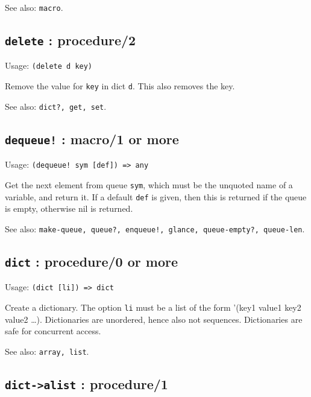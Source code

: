 \documentclass[
]{article}
\newcommand{\passthrough}[1]{#1}
\begin{document}
See also: \passthrough{\lstinline!macro!}.

\hypertarget{delete-procedure2-1}{%
\subsection{\texorpdfstring{\texttt{delete} :
procedure/2}{delete : procedure/2}}\label{delete-procedure2-1}}

Usage: \passthrough{\lstinline!(delete d key)!}

Remove the value for \passthrough{\lstinline!key!} in dict
\passthrough{\lstinline!d!}. This also removes the key.

See also: \passthrough{\lstinline!dict?, get, set!}.

\hypertarget{dequeue-macro1-or-more-1}{%
\subsection{\texorpdfstring{\texttt{dequeue!} : macro/1 or
more}{dequeue! : macro/1 or more}}\label{dequeue-macro1-or-more-1}}

Usage: \passthrough{\lstinline"(dequeue! sym [def]) => any"}

Get the next element from queue \passthrough{\lstinline!sym!}, which
must be the unquoted name of a variable, and return it. If a default
\passthrough{\lstinline!def!} is given, then this is returned if the
queue is empty, otherwise nil is returned.

See also:
\passthrough{\lstinline"make-queue, queue?, enqueue!, glance, queue-empty?, queue-len"}.

\hypertarget{dict-procedure0-or-more-1}{%
\subsection{\texorpdfstring{\texttt{dict} : procedure/0 or
more}{dict : procedure/0 or more}}\label{dict-procedure0-or-more-1}}

Usage: \passthrough{\lstinline!(dict [li]) => dict!}

Create a dictionary. The option \passthrough{\lstinline!li!} must be a
list of the form '(key1 value1 key2 value2 \ldots). Dictionaries are
unordered, hence also not sequences. Dictionaries are safe for
concurrent access.

See also: \passthrough{\lstinline!array, list!}.

\hypertarget{dict-alist-procedure1-1}{%
\subsection{\texorpdfstring{\texttt{dict-\textgreater{}alist} :
procedure/1}{dict-\textgreater alist : procedure/1}}\label{dict-alist-procedure1-1}}
\end{document}
